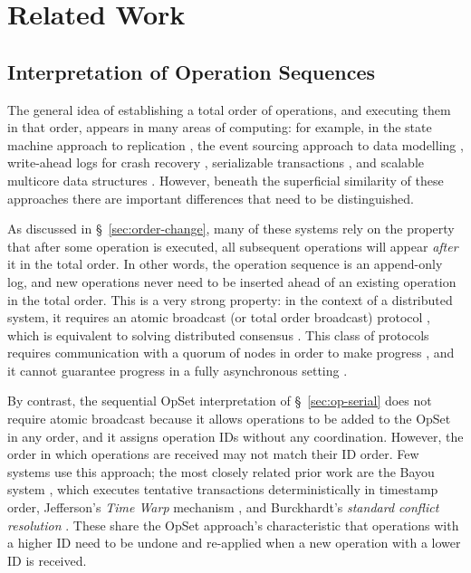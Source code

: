 \section{Related Work}\label{sec:relwork}

\subsection{Interpretation of Operation Sequences}\label{sec:op-sequences}

The general idea of establishing a total order of operations, and executing them in that order, appears in many areas of computing:
for example, in the state machine approach to replication \cite{Schneider:1990vy},
the event sourcing approach to data modelling \cite{Vernon:2013ww},
write-ahead logs for crash recovery \cite{Mohan:1992fe},
serializable transactions \cite{Davidson:1985hv},
and scalable multicore data structures \cite{BoydWickizer:2014uz}.
However, beneath the superficial similarity of these approaches there are important differences that need to be distinguished.

As discussed in \S~\ref{sec:order-change}, many of these systems rely on the property that after some operation is executed, all subsequent operations will appear \emph{after} it in the total order.
In other words, the operation sequence is an append-only log, and new operations never need to be inserted ahead of an existing operation in the total order.
This is a very strong property: in the context of a distributed system, it requires an atomic broadcast (or total order broadcast) protocol \cite{Defago:2004ji}, which is equivalent to solving distributed consensus \cite{Chandra:1996cp}.
This class of protocols requires communication with a quorum of nodes in order to make progress \cite{Howard:2016tz}, and it cannot guarantee progress in a fully asynchronous setting \cite{Fischer:1985tt}.

By contrast, the sequential OpSet interpretation of \S~\ref{sec:op-serial} does not require atomic broadcast because it allows operations to be added to the OpSet in any order, and it assigns operation IDs without any coordination.
However, the order in which operations are received may not match their ID order.
Few systems use this approach; the most closely related prior work are the Bayou system \cite{Terry:1995dn}, which executes tentative transactions deterministically in timestamp order, Jefferson's \emph{Time Warp} mechanism \cite{Jefferson:1985em}, and Burckhardt's \emph{standard conflict resolution} \cite[\S~4.3.3]{Burckhardt:2014hy}.
These share the OpSet approach's characteristic that operations with a higher ID need to be undone and re-applied when a new operation with a lower ID is received.

